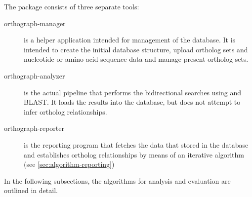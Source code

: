 \label{sec:algorithm}
The \pname package consists of three separate tools:

\begin{description}
	\item[orthograph-manager] is a helper application intended for management of
		the database. It is intended to create the initial database structure, upload
		ortholog sets and nucleotide or amino acid sequence data and manage present
		ortholog sets.
	\item[orthograph-analyzer] is the actual pipeline that performs the
		bidirectional searches using  and BLAST. It loads the
		results into the database, but does not attempt to infer ortholog
		relationships. 
	\item[orthograph-reporter] is the reporting program that fetches the data that
		 stored in the database and establishes ortholog
		relationships by means of an iterative algorithm (see
		\autoref{sec:algorithm-reporting})
\end{description}

In the following subsections, the algorithms for analysis and evaluation are
outlined in detail.
